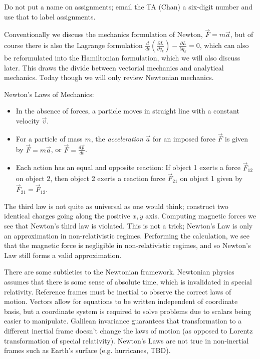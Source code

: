 \documentclass[10pt]{report}
\newcommand{\rd}[2]{\frac{d#1}{d#2}}
\newcommand{\pd}[2]{\frac{\partial #1}{\partial#2}}
\begin{document}
Do not put a name on assignments; email the TA (Chan) a six-digit number and use that to label assignments.

Conventionally we discuss the mechanics formulation of Newton, $\vec{F}=m\vec{a}$, but of course there is also the Lagrange formulation $\rd{}{t}\left(\pd{L}{\dot{q}_k} \right) - \pd{L}{q_k} = 0$, which can also be reformulated into the Hamiltonian formulation, which we will also discuss later. This draws the divide between vectorial mechanics and analytical mechanics. Today though we will only review Newtonian mechanics.

Newton's Laws of Mechanics:

\begin{itemize}
    \item In the absence of forces, a particle moves in straight line with a constant velocity $\vec{v}$. 
    \item For a particle of mass $m$, the \emph{acceleration} $\vec{a}$ for an imposed force $\vec{F}$ is given by $\vec{F} = m\vec{a}$, or $\vec{F} = \rd{\vec{p}}{t}$.
    \item Each action has an equal and opposite reaction: If object 1 exerts a force $\vec{F}_{12}$ on object 2, then object 2 exerts a reaction force $\vec{F}_{21}$ on object 1 given by $\vec{F}_{21}=\vec{F}_{12}$. 
\end{itemize}

The third law is not quite as universal as one would think; construct two identical charges going along the positive $x,y$ axis. Computing magnetic forces we see that Newton's third law is violated. This is not a trick; Newton's Law is only an approximation in non-relativistic regimes. Performing the calculation, we see that the magnetic force is negligible in non-relativistic regimes, and so Newton's Law still forms a valid approximation. 

There are some subtleties to the Newtonian framework. Newtonian physics assumes that there is some sense of absolute time, which is invalidated in special relativity. Reference frames must be inertial to observe the correct laws of motion. Vectors allow for equations to be written independent of coordinate basis, but a coordinate system is required to solve problems due to scalars being easier to manipulate. Galilean invariance guarantees that transformation to a different inertial frame doesn't change the laws of motion (as opposed to Lorentz transformation of special relativity). Newton's Laws are not true in non-inertial frames such as Earth's surface (e.g. hurricanes, TBD). 
\end{document}
